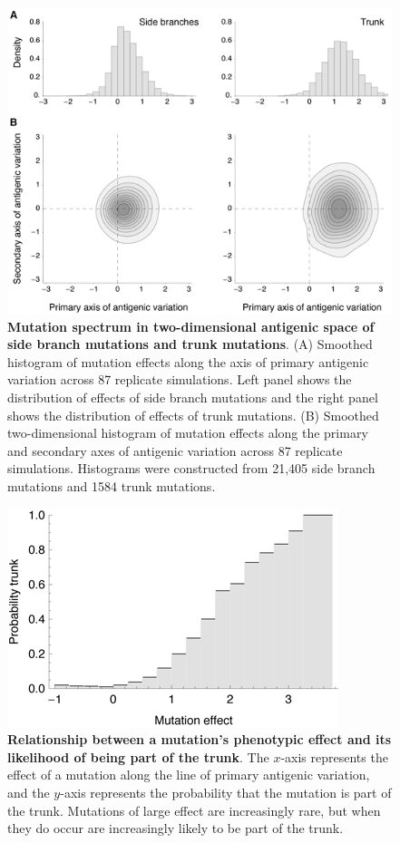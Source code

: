\documentclass[11pt,oneside,letterpaper]{article}
\begin{document}
\begin{figure}[H]
	\centering
	\includegraphics{figures/mutspectrum}
	\caption{\textbf{Mutation spectrum in two-dimensional antigenic space of side branch mutations and trunk mutations}. (A) Smoothed histogram of mutation effects along the axis of primary antigenic variation across 87 replicate simulations.  Left panel shows the distribution of effects of side branch mutations and the right panel shows the distribution of effects of trunk mutations. (B) Smoothed two-dimensional histogram of mutation effects along the primary and secondary axes of antigenic variation across 87 replicate simulations.  Histograms were constructed from 21,405 side branch mutations and 1584 trunk mutations.}
	\label{mutspectrum}
\end{figure}

\begin{figure}[H]
	\centering
	\includegraphics{figures/probtrunk}
	\caption{\textbf{Relationship between a mutation's phenotypic effect and its likelihood of being part of the trunk}. The $x$-axis represents the effect of a mutation along the line of primary antigenic variation, and the $y$-axis represents the probability that the mutation is part of the trunk.  Mutations of large effect are increasingly rare, but when they do occur are increasingly likely to be part of the trunk.}
	\label{probtrunk}
\end{figure}
\end{document}
